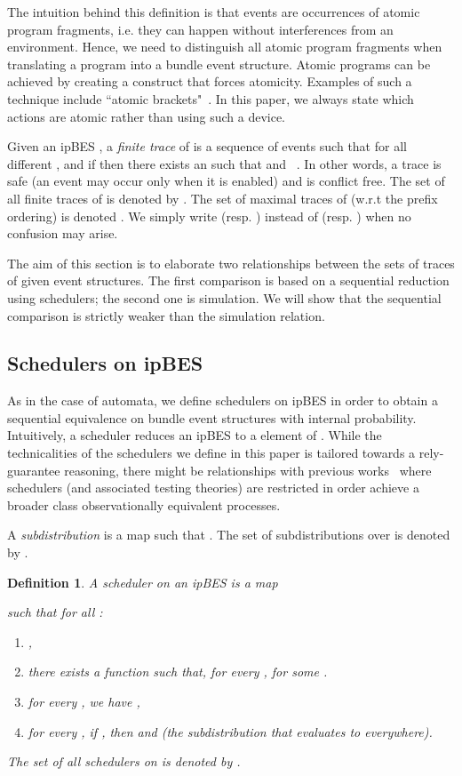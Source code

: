 \documentclass[review]{elsart}
\newtheorem{definition}{Definition}[section]
\newcommand{\Tx}{\color{orange}}
\begin{document}
The intuition behind this definition is that events are occurrences of atomic program fragments, i.e. they can happen without interferences from an environment. Hence, we need to distinguish all atomic program fragments when translating a program into a bundle event structure. Atomic programs can be achieved by creating a construct that forces atomicity. Examples of such a technique include ``atomic brackets"~\cite{Jon12}. In this paper, we always state which actions are atomic rather than using such a device.

Given an ipBES , a \emph{finite trace} of  is a sequence of events  such that for all different ,  and if  then there exists an  such that  and ~\cite{Lan92,Kat96,Rab13}. In other words, a trace is safe (an event may occur only when it is enabled) and is conflict free. The set of all finite traces of  is denoted by . The set of maximal traces of  (w.r.t the prefix ordering) is denoted . We simply write  (resp. ) instead of  (resp. ) when no confusion may arise.

The aim of this section is to elaborate two relationships between the sets of traces of given event structures. The first comparison is based on a sequential reduction using schedulers; the second one is simulation. We will show that the sequential comparison is strictly weaker than the simulation relation.

\subsection{Schedulers on ipBES}\label{sec:scheduler}

{\Tx
As in the case of automata, we define schedulers on ipBES in order to obtain a sequential equivalence on bundle event structures with internal probability. Intuitively, a scheduler reduces an ipBES to a element of . While the technicalities of the schedulers we define in this paper is tailored towards a rely-guarantee reasoning, there might be relationships with previous works~\cite{Geo10,Geo12} where schedulers (and associated testing theories) are restricted in order achieve a broader class observationally equivalent processes. 
}

A \emph{subdistribution} is a map  such that .  The set of subdistributions over  is denoted by .  

\begin{definition}\label{def:ipscheduler}
A \emph{scheduler}  on an ipBES  is a map 
 
such that for all :
\begin{enumerate}
\item ,\label{pr:sched-dom}
\item there exists a function  such that, for every ,  for some .
\label{pr:sched-choice}
\item for every , we have ,\label{pr:sched-prob}
\item for every , if , then   and  (the subdistribution that evaluates to  everywhere).\label{pr:sched-consistent}
\end{enumerate}
The set of all schedulers on  is denoted by .
\end{definition}
\end{document}
